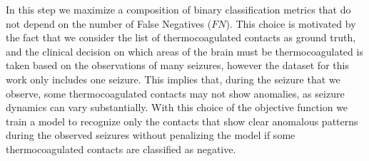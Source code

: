 In this step we maximize a composition of binary classification metrics that
do not depend on the number of False Negatives ($FN$).
This choice is motivated by the fact that we consider the list of
thermocoagulated contacts as ground truth, and
the clinical decision on which areas of the brain must be thermocoagulated is
taken based on the observations of many seizures, however the dataset for this
work only includes one seizure.
This implies that, during the seizure that we observe, some thermocoagulated
contacts may not show anomalies, as seizure dynamics can vary substantially.
With this choice of the objective function we train a model to recognize only 
the contacts that show clear anomalous patterns during the observed seizures
without penalizing the model if some thermocoagulated contacts are classified
as negative.

